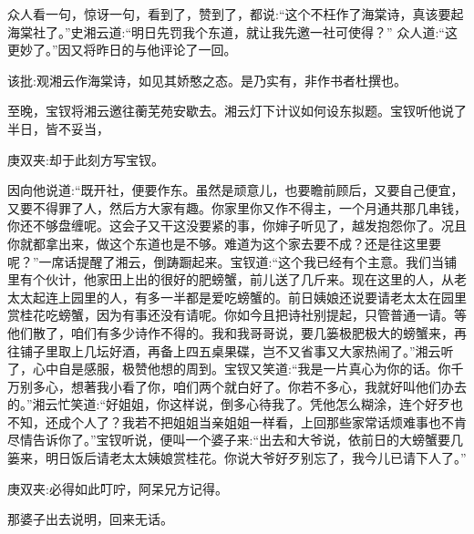 \begin{parag}
    众人看一句，惊讶一句，看到了，赞到了，都说:“这个不枉作了海棠诗，真该要起海棠社了。”史湘云道:“明日先罚我个东道，就让我先邀一社可使得？” 众人道:“这更妙了。”因又将昨日的与他评论了一回。\begin{note}该批:观湘云作海棠诗，如见其娇憨之态。是乃实有，非作书者杜撰也。\end{note}
\end{parag}


\begin{parag}
    至晚，宝钗将湘云邀往蘅芜苑安歇去。湘云灯下计议如何设东拟题。宝钗听他说了半日，皆不妥当，\begin{note}庚双夹:却于此刻方写宝钗。\end{note}因向他说道:“既开社，便要作东。虽然是顽意儿，也要瞻前顾后，又要自己便宜，又要不得罪了人，然后方大家有趣。你家里你又作不得主，一个月通共那几串钱，你还不够盘缠呢。这会子又干这没要紧的事，你婶子听见了，越发抱怨你了。况且你就都拿出来，做这个东道也是不够。难道为这个家去要不成？还是往这里要呢？”一席话提醒了湘云，倒踌蹰起来。宝钗道:“这个我已经有个主意。我们当铺里有个伙计，他家田上出的很好的肥螃蟹，前儿送了几斤来。现在这里的人，从老太太起连上园里的人，有多一半都是爱吃螃蟹的。前日姨娘还说要请老太太在园里赏桂花吃螃蟹，因为有事还没有请呢。你如今且把诗社别提起，只管普通一请。等他们散了，咱们有多少诗作不得的。我和我哥哥说，要几篓极肥极大的螃蟹来，再往铺子里取上几坛好酒，再备上四五桌果碟，岂不又省事又大家热闹了。”湘云听了，心中自是感服，极赞他想的周到。宝钗又笑道:“我是一片真心为你的话。你千万别多心，想著我小看了你，咱们两个就白好了。你若不多心，我就好叫他们办去的。”湘云忙笑道:“好姐姐，你这样说，倒多心待我了。凭他怎么糊涂，连个好歹也不知，还成个人了？我若不把姐姐当亲姐姐一样看，上回那些家常话烦难事也不肯尽情告诉你了。”宝钗听说，便叫一个婆子来:“出去和大爷说，依前日的大螃蟹要几篓来，明日饭后请老太太姨娘赏桂花。你说大爷好歹别忘了，我今儿已请下人了。”\begin{note}庚双夹:必得如此叮咛，阿呆兄方记得。\end{note}那婆子出去说明，回来无话。
\end{parag}



